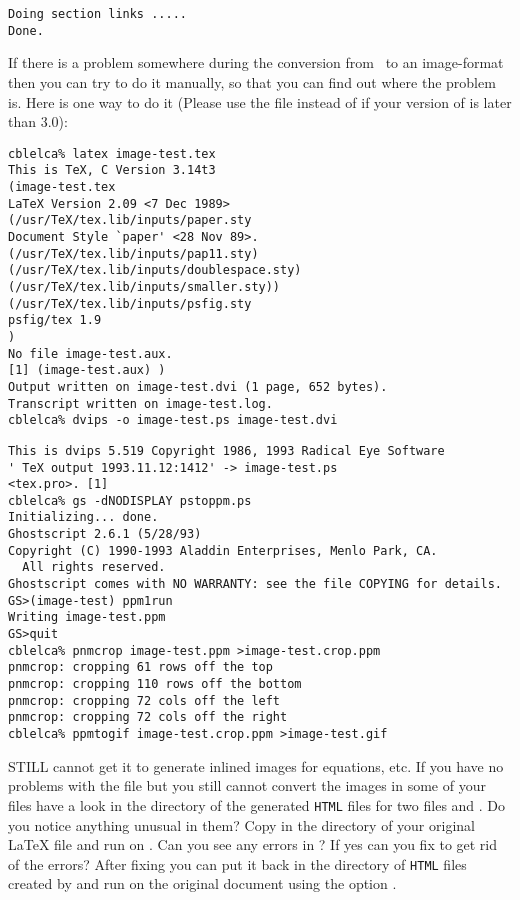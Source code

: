\begin{htmllist}
\begin{small}
\begin{verbatim}
Doing section links .....
Done.
\end{verbatim}
\end{small}


If there is a problem somewhere during the conversion from \PS\
to an image-format then you can try to do it manually,
so that you can find out where the problem is.
Here is one way to do it (Please use the 
file instead of  if your version of  is
later than 3.0):
%
\begin{small}
\begin{verbatim}
cblelca% latex image-test.tex
This is TeX, C Version 3.14t3
(image-test.tex
LaTeX Version 2.09 <7 Dec 1989>
(/usr/TeX/tex.lib/inputs/paper.sty
Document Style `paper' <28 Nov 89>.
(/usr/TeX/tex.lib/inputs/pap11.sty)
(/usr/TeX/tex.lib/inputs/doublespace.sty)
(/usr/TeX/tex.lib/inputs/smaller.sty))
(/usr/TeX/tex.lib/inputs/psfig.sty
psfig/tex 1.9
)
No file image-test.aux.
[1] (image-test.aux) )
Output written on image-test.dvi (1 page, 652 bytes).
Transcript written on image-test.log.
cblelca% dvips -o image-test.ps image-test.dvi
\end{verbatim}
\begin{verbatim}
This is dvips 5.519 Copyright 1986, 1993 Radical Eye Software
' TeX output 1993.11.12:1412' -> image-test.ps
<tex.pro>. [1]
cblelca% gs -dNODISPLAY pstoppm.ps
Initializing... done.
Ghostscript 2.6.1 (5/28/93)
Copyright (C) 1990-1993 Aladdin Enterprises, Menlo Park, CA.
  All rights reserved.
Ghostscript comes with NO WARRANTY: see the file COPYING for details.
GS>(image-test) ppm1run
Writing image-test.ppm
GS>quit
cblelca% pnmcrop image-test.ppm >image-test.crop.ppm
pnmcrop: cropping 61 rows off the top
pnmcrop: cropping 110 rows off the bottom
pnmcrop: cropping 72 cols off the left
pnmcrop: cropping 72 cols off the right
cblelca% ppmtogif image-test.crop.ppm >image-test.gif
\end{verbatim}
\end{small}

\item [STILL cannot get it to generate inlined images for equations, etc. ]
If you have no problems with the \fn{image-test.tex} file but you
still cannot convert the images in some of your files
have a look in the directory of the generated
\texttt{HTML} files for two files  and . Do you notice
anything unusual in them? Copy \fn{images.tex} in the directory
of your original \LaTeX{} file and run  on .
Can you see any errors in \fn{images.log}? If yes can you fix
 to get rid of the errors?
After fixing \fn{images.tex}
you can put it back in the directory of \texttt{HTML} files created by
\latextohtml{} and run \latextohtml{} on the original document
using the option .


\end{htmllist}
